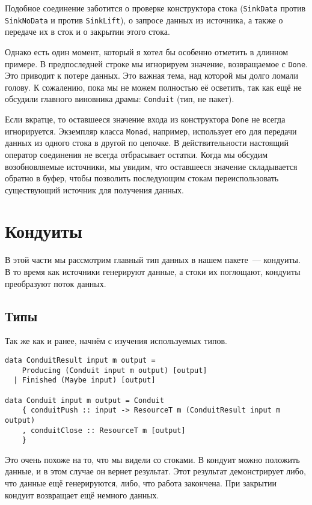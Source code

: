 Подобное соединение заботится о проверке конструктора стока (\lstinline'SinkData' против
\lstinline'SinkNoData' и против \lstinline'SinkLift'), о запросе данных из источника, а также о передаче их
в сток и о закрытии этого стока.

Однако есть один момент, который я хотел бы особенно отметить в длинном примере. В предпоследней строке
мы игнорируем значение, возвращаемое с \lstinline'Done'. Это приводит
к потере данных. Это важная тема, над которой мы долго ломали голову. К сожалению,
пока мы не можем полностью её осветить, так как ещё не обсудили главного виновника
драмы: \lstinline'Conduit' (тип, не пакет).

Если вкратце, то оставшееся значение входа из конструктора \lstinline{Done} не всегда игнорируется. Экземпляр класса \lstinline{Monad},
например, использует его для передачи данных из одного стока в другой по цепочке.
В действительности настоящий оператор соединения не всегда отбрасывает остатки. Когда мы
обсудим возобновляемые источники, мы
увидим, что оставшееся значение складывается обратно в буфер, чтобы позволить последующим
стокам переиспользовать существующий источник для получения данных.

\section{Кондуиты}
В этой части мы рассмотрим главный тип данных в нашем пакете~--- кондуиты. В то время как
источники генерируют данные, а стоки их поглощают, кондуиты преобразуют поток данных.

\subsection{Типы}
Так же как и ранее, начнём с изучения используемых типов.
\begin{lstlisting}
data ConduitResult input m output =
    Producing (Conduit input m output) [output]
  | Finished (Maybe input) [output]

data Conduit input m output = Conduit
    { conduitPush :: input -> ResourceT m (ConduitResult input m output)
    , conduitClose :: ResourceT m [output]
    }
\end{lstlisting}
Это очень похоже на то, что мы видели со стоками. В кондуит можно положить данные, и в этом
случае он вернет результат. Этот результат демонстрирует либо, что данные ещё
генерируются, либо, что работа закончена. При закрытии кондуит возвращает ещё немного данных.

